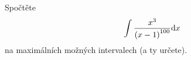 \documentclass[answers]{exam}
\begin{document}
\begin{questions}
%  
  
%  

  \question[2] Spočtěte
  \begin{equation*}
    \int \frac{x^3}{\parens{x - 1}^{100}} \diff x
  \end{equation*}
  na maximálních možných intervalech (a ty určete).
  

\end{questions}
\end{document}
